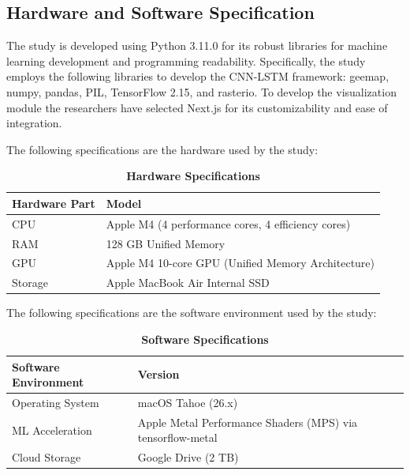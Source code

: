 \documentclass[12pt, letterpaper]{article}
\numberwithin{figure}{section}
\numberwithin{table}{section}
\begin{document}
\subsection{Hardware and Software Specification}
The study is developed using Python 3.11.0 for its robust libraries
for machine learning development and programming readability.
Specifically, the study employs the following libraries to develop
the CNN-LSTM framework: geemap, numpy, pandas, PIL, TensorFlow 2.15,
and rasterio. To develop the visualization module the researchers
have selected Next.js for its customizability and ease of integration.

The following specifications are the hardware used by the study:

\begin{table}[H]
  \centering
  \caption[Hardware specifications]{\textbf{Hardware Specifications}}
  \label{tab:hardware}

  \renewcommand{\arraystretch}{1.15} %

  \begin{tabularx}{\textwidth}{|p{3cm}|X|}
    \hline
    \rowcolor[gray]{0.9}
    \textbf{Hardware Part} & \textbf{Model} \\ \hline
    CPU & Apple M4 (4 performance cores, 4 efficiency cores) \\ \hline
    RAM & 128 GB Unified Memory \\ \hline
    GPU & Apple M4 10-core GPU (Unified Memory Architecture) \\ \hline
    Storage & Apple MacBook Air Internal SSD \\ \hline
  \end{tabularx}
\end{table}

The following specifications are the software environment used by the study:

\begin{table}[H]
  \centering
  \caption[Software specifications]{\textbf{Software Specifications}}
  \label{tab:software}
  \renewcommand{\arraystretch}{1.15}

  \begin{tabularx}{\textwidth}{|p{5cm}|X|}
    \hline
    \rowcolor[gray]{0.9}
    \textbf{Software Environment} & \textbf{Version} \\ \hline
    Operating System & macOS Tahoe (26.x) \\ \hline
    ML Acceleration & Apple Metal Performance Shaders (MPS) via
    tensorflow-metal \\ \hline
    Cloud Storage & Google Drive (2 TB) \\ \hline
  \end{tabularx}

\end{table}
\end{document}
